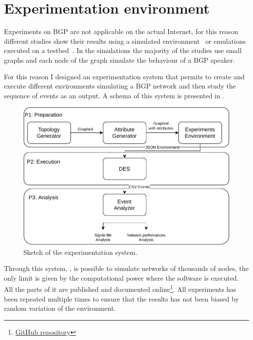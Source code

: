 \chapter{Experimentation environment}
\label{cha:des}

Experiments on \ac{BGP} are not applicable on the actual Internet, for this
reason different studies show their results using a simulated environment~\cite{griffin2001experimental}
or emulations executed on a testbed~\cite{milani2020improving}.
In the simulations the majority of the studies use small graphs and each node
of the graph simulate the behaviour of a \ac{BGP} speaker.

For this reason I designed an experimentation system that permits to create and execute
different environments simulating a \ac{BGP} network and then study the sequence
of events as an output.
A schema of this system is presented in .

\begin{figure}[ht]
    \centering
    \includegraphics[scale=0.75]{images/toolchain.pdf}
    \caption{Sketch of the experimentation system.}
    \label{fig:exp_sketch}
\end{figure}

Through this system, , is possible to simulate networks
of thousands of nodes, the only limit is given by the computational power where
the software is executed.
All the parts of it are published and documented
online\footnote{\href{https://github.com/tiamilani/BGPFSM}{GitHub repository}}.
All experiments has been repeated multiple times to ensure that the results
has not been biased by random variation of the environment.

